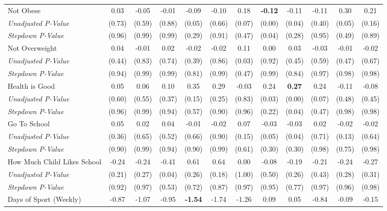 \begin{tabular}{l c c c c c c c c c c c}
Not Obese & 0.03 & -0.05 & -0.01 & -0.09 & -0.10 & 0.18 & \textbf{ -0.12 } & -0.11 & -0.11 & 0.30 & 0.21 \\
\quad \textit{Unadjusted P-Value} & (0.73) & (0.59) & (0.88) & (0.05) & (0.66) & (0.07) & (0.00) & (0.04) & (0.40) & (0.05) & (0.16) \\
\quad \textit{Stepdown P-Value} & (0.96) & (0.99) & (0.99) & (0.29) & (0.91) & (0.47) & (0.04) & (0.28) & (0.95) & (0.49) & (0.89) \\
Not Overweight & 0.04 & -0.01 & 0.02 & -0.02 & -0.02 & 0.11 & 0.00 & 0.03 & -0.03 & -0.01 & -0.02 \\
\quad \textit{Unadjusted P-Value} & (0.44) & (0.83) & (0.74) & (0.39) & (0.86) & (0.03) & (0.92) & (0.45) & (0.59) & (0.47) & (0.67) \\
\quad \textit{Stepdown P-Value} & (0.94) & (0.99) & (0.99) & (0.81) & (0.99) & (0.47) & (0.99) & (0.84) & (0.97) & (0.98) & (0.98) \\
Health is Good & 0.05 & 0.06 & 0.10 & 0.35 & 0.29 & -0.03 & 0.24 & \textbf{ 0.27 } & 0.24 & -0.11 & -0.08 \\
\quad \textit{Unadjusted P-Value} & (0.60) & (0.55) & (0.37) & (0.15) & (0.25) & (0.83) & (0.03) & (0.00) & (0.07) & (0.48) & (0.45) \\
\quad \textit{Stepdown P-Value} & (0.96) & (0.99) & (0.94) & (0.57) & (0.90) & (0.96) & (0.22) & (0.04) & (0.47) & (0.98) & (0.98) \\
Go To School & 0.05 & 0.02 & 0.04 & -0.01 & -0.02 & 0.07 & -0.03 & -0.03 & 0.02 & -0.02 & -0.02 \\
\quad \textit{Unadjusted P-Value} & (0.36) & (0.65) & (0.52) & (0.66) & (0.90) & (0.15) & (0.05) & (0.04) & (0.71) & (0.13) & (0.64) \\
\quad \textit{Stepdown P-Value} & (0.90) & (0.99) & (0.94) & (0.90) & (0.99) & (0.61) & (0.30) & (0.30) & (0.98) & (0.75) & (0.98) \\
How Much Child Likes School & -0.24 & -0.24 & -0.41 & 0.61 & 0.64 & 0.00 & -0.08 & -0.19 & -0.21 & -0.24 & -0.27 \\
\quad \textit{Unadjusted P-Value} & (0.21) & (0.27) & (0.04) & (0.26) & (0.18) & (1.00) & (0.50) & (0.26) & (0.43) & (0.28) & (0.31) \\
\quad \textit{Stepdown P-Value} & (0.92) & (0.97) & (0.53) & (0.72) & (0.87) & (0.97) & (0.95) & (0.77) & (0.97) & (0.96) & (0.98) \\
Days of Sport (Weekly) & -0.87 & -1.07 & -0.95 & \textbf{ -1.54 } & -1.74 & -1.26 & 0.09 & 0.05 & -0.84 & -0.09 & -0.15 \\

\end{tabular}
